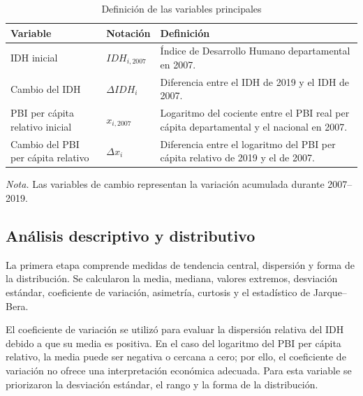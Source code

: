 \begin{table}[H]
\centering
\caption{Definición de las variables principales}
\label{tab:definicion_variables}
\small
\begin{threeparttable}
\begin{tabular}{p{3.5cm}p{3.2cm}p{6.2cm}}
\toprule
\textbf{Variable} &
\textbf{Notación} &
\textbf{Definición} \\
\midrule
IDH inicial &
$IDH_{i,2007}$ &
Índice de Desarrollo Humano departamental en 2007. \\

Cambio del IDH &
$\Delta IDH_i$ &
Diferencia entre el IDH de 2019 y el IDH de 2007. \\

PBI per cápita relativo inicial &
$x_{i,2007}$ &
Logaritmo del cociente entre el PBI real per cápita departamental y el
nacional en 2007. \\

Cambio del PBI per cápita relativo &
$\Delta x_i$ &
Diferencia entre el logaritmo del PBI per cápita relativo de 2019 y el de
2007. \\
\bottomrule
\end{tabular}
\begin{tablenotes}
\footnotesize
\item \textit{Nota.} Las variables de cambio representan la variación
acumulada durante 2007--2019.
\end{tablenotes}
\end{threeparttable}
\end{table}

\subsection{Análisis descriptivo y distributivo}

La primera etapa comprende medidas de tendencia central, dispersión y forma de
la distribución. Se calcularon la media, mediana, valores extremos, desviación
estándar, coeficiente de variación, asimetría, curtosis y el estadístico de
Jarque--Bera.

El coeficiente de variación se utilizó para evaluar la dispersión relativa del
IDH debido a que su media es positiva. En el caso del logaritmo del PBI per
cápita relativo, la media puede ser negativa o cercana a cero; por ello, el
coeficiente de variación no ofrece una interpretación económica adecuada. Para
esta variable se priorizaron la desviación estándar, el rango y la forma de la
distribución.

